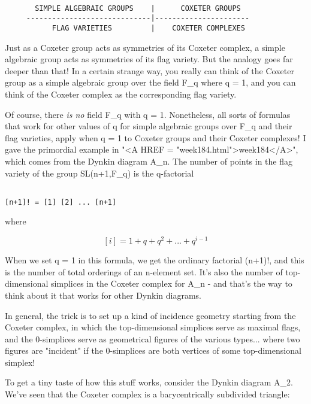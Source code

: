 \begin{verbatim}

       SIMPLE ALGEBRAIC GROUPS    |      COXETER GROUPS
     -----------------------------|----------------------
           FLAG VARIETIES         |    COXETER COMPLEXES
\end{verbatim}
    
Just as a Coxeter group acts as symmetries of its Coxeter complex,
a simple algebraic group acts as symmetries of its flag variety.  
But the analogy goes far deeper than that!  In a certain strange way, 
you really can think of the Coxeter group as a simple algebraic 
group over the field F_{q} where q = 1, and you can think of the Coxeter
complex as the corresponding flag variety.

Of course, there \emph{is no} field F_{q} with q = 1.  Nonetheless, all
sorts of formulas that work for other values of q for simple algebraic
groups over F_{q} and their flag varieties, apply when q = 1 to Coxeter
groups and their Coxeter complexes!  I gave the primordial example in
"<A HREF = "week184.html">week184</A>", which comes from the
Dynkin diagram A_{n}.  The number of points in the flag variety
of the group SL(n+1,F_{q}) is the q-factorial


\begin{verbatim}

[n+1]! = [1] [2] ... [n+1]
\end{verbatim}
    
where


$$

[i] = 1 + q + q^{2} + ... + q^{i-1}
$$
    
When we set q = 1 in this formula, we get the ordinary factorial
(n+1)!, and this is the number of total orderings of an n-element set.
It's also the number of top-dimensional simplices in the Coxeter 
complex for A_{n} - and that's the way to think about it that works for
other Dynkin diagrams.

In general, the trick is to set up a kind of incidence geometry starting
from the Coxeter complex, in which the top-dimensional simplices serve
as maximal flags, and the 0-simplices serve as geometrical figures of
the various types... where two figures are "incident" if the
0-simplices are both vertices of some top-dimensional simplex!

To get a tiny taste of how this stuff works, consider the Dynkin diagram
A_{2}.  We've seen that the Coxeter complex is a barycentrically
subdivided triangle:


